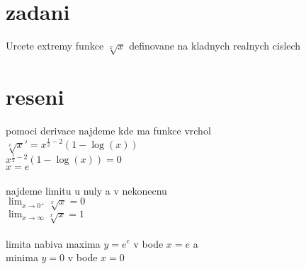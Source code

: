 \documentclass[a4paper]{article}
\begin{document}
\section*{zadani}
Urcete extremy funkce
$\sqrt[x]{x}$
definovane na kladnych realnych cislech

\section*{reseni}

pomoci derivace najdeme kde ma funkce vrchol\\
$\sqrt[x]{x}' = x^{\frac{1}{2}-2} (1-\log(x))$\\
$x^{\frac{1}{2}-2} (1-\log(x)) = 0$\\
$x = e$\\
\\
najdeme limitu u nuly a v nekonecnu\\
$\lim_{x \rightarrow 0^+} \sqrt[x]{x} = 0$\\
$\lim_{x \rightarrow \infty} \sqrt[x]{x} = 1$\\
\\
limita nabiva maxima $y=e^e$ v bode $x=e$ a\\
minima $y=0$ v bode $x=0$



\end{document}
